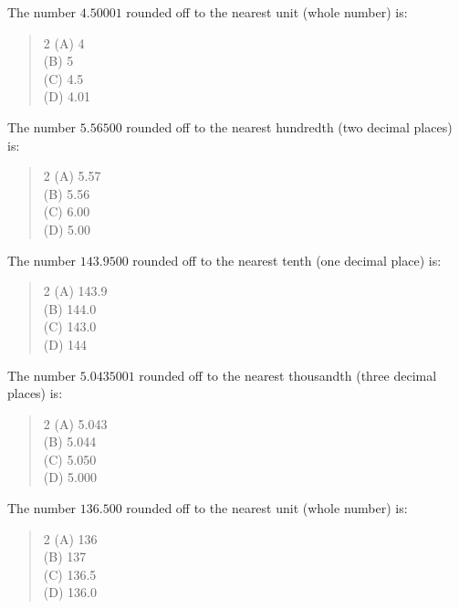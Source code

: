 \documentclass[11pt,a4paper]{article}
\begin{document}
\begin{mcqlist}
\item The number $4.50001$ rounded off to the nearest unit (whole number) is:
\begin{quote}\begin{multicols}{2}
\noindent (A) 4 \\
(B) 5 \\
(C) 4.5 \\
(D) 4.01
\end{multicols}\end{quote}

\item The number $5.56500$ rounded off to the nearest hundredth (two decimal places) is:
\begin{quote}\begin{multicols}{2}
\noindent (A) 5.57 \\
(B) 5.56 \\
(C) 6.00 \\
(D) 5.00
\end{multicols}\end{quote}

\item The number $143.9500$ rounded off to the nearest tenth (one decimal place) is:
\begin{quote}\begin{multicols}{2}
\noindent (A) 143.9 \\
(B) 144.0 \\
(C) 143.0 \\
(D) 144
\end{multicols}\end{quote}

\item The number $5.0435001$ rounded off to the nearest thousandth (three decimal places) is:
\begin{quote}\begin{multicols}{2}
\noindent (A) 5.043 \\
(B) 5.044 \\
(C) 5.050 \\
(D) 5.000
\end{multicols}\end{quote}

\item The number $136.500$ rounded off to the nearest unit (whole number) is:
\begin{quote}\begin{multicols}{2}
\noindent (A) 136 \\
(B) 137 \\
(C) 136.5 \\
(D) 136.0
\end{multicols}\end{quote}


\end{mcqlist}
\end{document}
